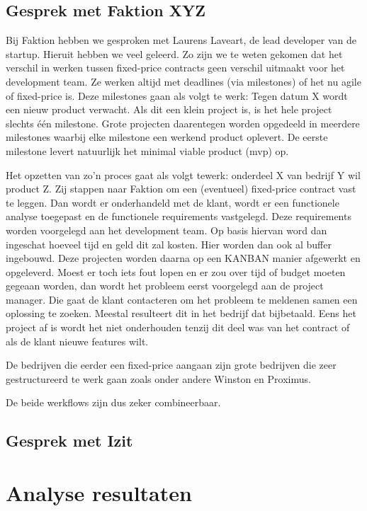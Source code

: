 \documentclass{hogent-article}
\begin{document}
    \subsection{Gesprek met Faktion XYZ}
    Bij Faktion hebben we gesproken met Laurens Laveart, de lead developer van de startup. Hieruit hebben we veel geleerd. Zo zijn we te weten gekomen dat het verschil in werken tussen fixed-price contracts geen verschil uitmaakt voor het development team. Ze werken altijd met deadlines (via milestones) of het nu agile of fixed-price is. Deze milestones gaan als volgt te werk: Tegen datum X wordt een nieuw product verwacht. Als dit een klein project is, is het hele project slechts één milestone. Grote projecten daarentegen worden opgedeeld in meerdere milestones waarbij elke milestone een werkend product oplevert. De eerste milestone levert natuurlijk het minimal viable product (mvp) op.
    
    Het opzetten van zo'n proces gaat als volgt tewerk: onderdeel X van bedrijf Y wil product Z. Zij stappen naar Faktion om een (eventueel) fixed-price contract vast te leggen. Dan wordt er onderhandeld met de klant, wordt er een functionele analyse toegepast en de functionele requirements vastgelegd. Deze requirements worden voorgelegd aan het development team. Op basis hiervan word dan ingeschat hoeveel tijd en geld dit zal kosten. Hier worden dan ook al buffer ingebouwd. Deze projecten worden daarna op een KANBAN manier afgewerkt en opgeleverd. Moest er toch iets fout lopen en er zou over tijd of budget moeten gegeaan worden, dan wordt het probleem eerst voorgelegd aan de project manager. Die gaat de klant contacteren om het probleem te meldenen samen een oplossing te zoeken. Meestal resulteert dit in het bedrijf dat bijbetaald. Eens het project af is wordt het niet onderhouden tenzij dit deel was van het contract of als de klant nieuwe features wilt.
    
    De bedrijven die eerder een fixed-price aangaan zijn grote bedrijven die zeer gestructureerd te werk gaan zoals onder andere Winston en Proximus.
    
    De beide werkflows zijn dus zeker combineerbaar.
    
    \subsection{Gesprek met Izit}
	\section{Analyse resultaten}
	
\end{document}
